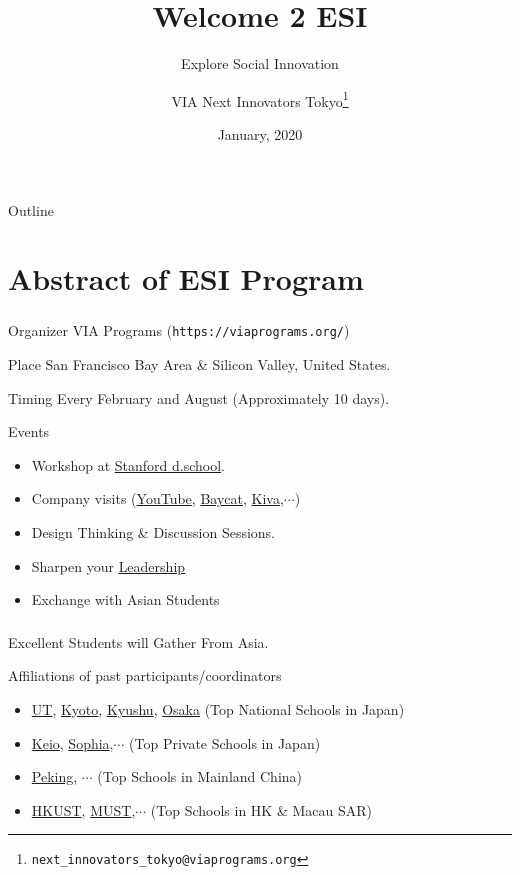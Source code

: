 \documentclass[dvipdfmx,10pt]{beamer}
\title{Welcome 2 ESI}
\subtitle{Explore Social Innovation}
\author[VIA Next Innovators Tokyo]{VIA Next Innovators Tokyo\footnote{\texttt{next\_innovators\_tokyo@viaprograms.org}}}
\institute{Authorized Affiliate of \href{https://viaprograms.org/}{VIA Programs}}
\date[Jan., 2020]{January, 2020}
\newcommand{\bb}{\begin{block}}
\newcommand{\eb}{\end{block}}
\newcommand{\ft}{\frametitle}
\begin{document}
\begin{frame}
\titlepage
\end{frame}
\begin{frame}{Outline}
  \setcounter{tocdepth}{3}  
  \tableofcontents[
    sectionstyle=show,
    subsectionstyle=show/show,
    subsubsectionstyle=show/show/show
    ]
\end{frame}
\section{Abstract of ESI Program}
\begin{frame}\ft{\insertsection}
\footnotesize
\bb{Organizer}
VIA Programs (\texttt{https://viaprograms.org/})
\eb
\bb{Place}
San Francisco Bay Area \& Silicon Valley, United States.
\eb
\bb{Timing}
Every February and August (Approximately 10 days).
\eb
\bb{Events}
\begin{itemize}
\item Workshop at \href{https://dschool.stanford.edu/}{Stanford d.school}.
\item Company visits (\href{https://en.wikipedia.org/wiki/YouTube
}{YouTube}, \href{https://www.baycat.org/}{Baycat}, \href{https://www.kiva.org/}{Kiva},$\cdots$)
\item Design Thinking \& Discussion Sessions.
\item Sharpen your \href{https://en.wikipedia.org/wiki/Leadership}{Leadership}
\item Exchange with Asian Students
\end{itemize}
\eb
\normalsize
\end{frame}
\begin{frame}\ft{\insertsection}
Excellent Students will Gather From Asia.
\begin{exampleblock}{Affiliations of past participants/coordinators}
\begin{itemize}
\item \href{https://www.u-tokyo.ac.jp/en/}{UT}, \href{https://www.kyoto-u.ac.jp/en/}{Kyoto}, \href{http://www.kyushu-u.ac.jp/en/}{Kyushu}, \href{https://www.osaka-u.ac.jp/en}{Osaka} (Top National Schools in Japan)
\item \href{https://www.keio.ac.jp/en/}{Keio}, \href{https://www.sophia.ac.jp/eng/}{Sophia},$\cdots$ (Top Private Schools in Japan)
\item \href{http://english.pku.edu.cn/}{Peking}, $\cdots$ (Top Schools in Mainland China)
\item \href{https://www.ust.hk/}{HKUST}, \href{https://www.must.edu.mo/en}{MUST},$\cdots$ (Top Schools in HK \& Macau SAR)
\end{itemize}
\end{exampleblock}
\end{frame}
\end{document}
